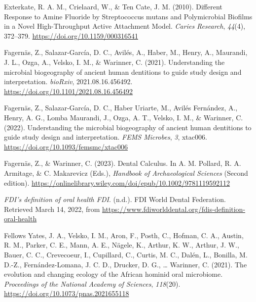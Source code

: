 \documentclass[
  letterpaper,
]{book}
\newlength{\cslhangindent}
\newlength{\cslentryspacingunit} %
\newenvironment{CSLReferences}[2] %
 {%
  \setlength{\parindent}{0pt}
  \ifodd #1
  \let\oldpar\par
  \def\par{\hangindent=\cslhangindent\oldpar}
  \fi
  \setlength{\parskip}{#2\cslentryspacingunit}
 }%
 {}
\begin{document}
\begin{CSLReferences}{1}{0}
\leavevmode{}%
Exterkate, R. A. M., Crielaard, W., \& Ten Cate, J. M. (2010). Different
{Response} to {Amine Fluoride} by {Streptococcus} mutans and
{Polymicrobial Biofilms} in a {Novel High-Throughput Active Attachment
Model}. \emph{Caries Research}, \emph{44}(4), 372--379.
\url{https://doi.org/10.1159/000316541}

\leavevmode{}%
Fagernäs, Z., Salazar-García, D. C., Avilés, A., Haber, M., Henry, A.,
Maurandi, J. L., Ozga, A., Velsko, I. M., \& Warinner, C. (2021).
Understanding the microbial biogeography of ancient human dentitions to
guide study design and interpretation. \emph{bioRxiv},
2021.08.16.456492. \url{https://doi.org/10.1101/2021.08.16.456492}

\leavevmode{}%
Fagernäs, Z., Salazar-García, D. C., Haber Uriarte, M., Avilés
Fernández, A., Henry, A. G., Lomba Maurandi, J., Ozga, A. T., Velsko, I.
M., \& Warinner, C. (2022). Understanding the microbial biogeography of
ancient human dentitions to guide study design and interpretation.
\emph{FEMS Microbes}, \emph{3}, xtac006.
\url{https://doi.org/10.1093/femsmc/xtac006}

\leavevmode{}%
Fagernäs, Z., \& Warinner, C. (2023). Dental {Calculus}. In A. M.
Pollard, R. A. Armitage, \& C. Makarevicz (Eds.), \emph{Handbook of
{Archaeological Sciences}} (Second edition).
\url{https://onlinelibrary.wiley.com/doi/epub/10.1002/9781119592112}

\leavevmode{}%
\emph{{FDI}'s definition of oral health \textbar{} {FDI}}. (n.d.). {FDI
World Dental Federation}. Retrieved March 14, 2022, from
\url{https://www.fdiworlddental.org/fdis-definition-oral-health}

\leavevmode{}%
Fellows Yates, J. A., Velsko, I. M., Aron, F., Posth, C., Hofman, C. A.,
Austin, R. M., Parker, C. E., Mann, A. E., Nägele, K., Arthur, K. W.,
Arthur, J. W., Bauer, C. C., Crevecoeur, I., Cupillard, C., Curtis, M.
C., Dalén, L., Bonilla, M. D.-Z., Fernández-Lomana, J. C. D., Drucker,
D. G., \ldots{} Warinner, C. (2021). The evolution and changing ecology
of the {African} hominid oral microbiome. \emph{Proceedings of the
National Academy of Sciences}, \emph{118}(20).
\url{https://doi.org/10.1073/pnas.2021655118}


\end{CSLReferences}
\end{document}
